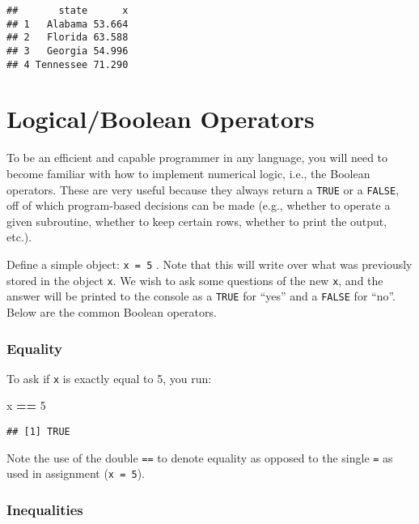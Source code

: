 \documentclass[]{book}
\newenvironment{Shaded}{\begin{snugshade}}{\end{snugshade}}
\newcommand{\DecValTok}[1]{\textcolor[rgb]{0.00,0.00,0.81}{#1}}
\newcommand{\StringTok}[1]{\textcolor[rgb]{0.31,0.60,0.02}{#1}}
\newcommand{\OperatorTok}[1]{\textcolor[rgb]{0.81,0.36,0.00}{\textbf{#1}}}
\newcommand{\NormalTok}[1]{#1}
\theoremstyle{definition}
\theoremstyle{definition}
\theoremstyle{definition}
\theoremstyle{remark}
\begin{document}
\begin{verbatim}
##       state      x
## 1   Alabama 53.664
## 2   Florida 63.588
## 3   Georgia 54.996
## 4 Tennessee 71.290
\end{verbatim}

\section{Logical/Boolean Operators}\label{logicalboolean-operators}

To be an efficient and capable programmer in any language, you will need
to become familiar with how to implement numerical logic, i.e., the
Boolean operators. These are very useful because they always return a
\texttt{TRUE} or a \texttt{FALSE}, off of which program-based decisions
can be made (e.g., whether to operate a given subroutine, whether to
keep certain rows, whether to print the output, etc.).

Define a simple object: \texttt{x\ =\ 5} . Note that this will write
over what was previously stored in the object \texttt{x}. We wish to ask
some questions of the new \texttt{x}, and the answer will be printed to
the console as a \texttt{TRUE} for ``yes'' and a \texttt{FALSE} for
``no''. Below are the common Boolean operators.

\subsubsection*{Equality}\label{equality}

To ask if \texttt{x} is exactly equal to 5, you run:

\begin{Shaded}
\begin{Highlighting}[]
\NormalTok{x }\OperatorTok{==}\StringTok{ }\DecValTok{5}
\end{Highlighting}
\end{Shaded}

\begin{verbatim}
## [1] TRUE
\end{verbatim}

Note the use of the double \texttt{==} to denote equality as opposed to
the single \texttt{=} as used in assignment (\texttt{x\ =\ 5}).

\subsubsection*{Inequalities}\label{inequalities}
\end{document}
